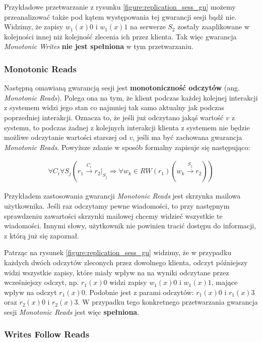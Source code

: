 Przykładowe przetwarzanie z rysunku \ref{figure:replication_sess_gu} możemy przeanalizować także pod kątem występowania tej gwarancji sesji bądź nie. Widzimy, że zapisy $ w_1(x)0 $ i $ w_1(x)1 $ na serwerze $ S_2 $ zostały zaaplikowane w kolejności innej niż kolejność zlecenia ich przez klienta. Tak więc gwarancja \textit{Monotonic Writes} \textbf{nie jest spełniona} w tym przetwarzaniu.

\subsubsection{Monotonic Reads}

Następną omawianą gwarancją sesji jest \textbf{monotoniczność odczytów} (ang. \textit{Monotonic Reads}). Polega ona na tym, że klient podczas każdej kolejnej interakcji z systemem widzi jego stan co najmniej tak samo aktualny jak podczas poprzedniej interakcji. Oznacza to, że jeśli już odczytano jakąś wartość $ v $ z systemu, to podczas żadnej z kolejnych interakcji klienta z systemem nie będzie możliwe odczytanie wartości starszej od $ v $, jeśli ma być zachowana gwarancja \textit{Monotonic Reads}. Powyższe zdanie w sposób formalny zapisuje się następująco:

\begin{align*}
    \forall{C_i} \forall{S_j} (r_1 \xrightarrow{C_i} r_2|_{S_j} \Rightarrow \forall{w_k} \in RW(r_1) (w_k \xrightarrow{S_j} r_2))
\end{align*}

Przykładem zastosowania gwarancji \textit{Monotonic Reads} jest skrzynka mailowa użytkownika. Jeśli raz odczytamy pewne wiadomości, to przy następnym sprawdzeniu zawartości skrzynki mailowej chcemy widzieć wszystkie te wiadomości. Innymi słowy, użytkownik nie powinien tracić dostępu do informacji, z którą już się zapoznał.

Patrząc na rysunek \ref{figure:replication_sess_gu} widzimy, że w przypadku każdych dwóch odczytów zleconych przez dowolnego klienta, odczyt późniejszy widzi wszystkie zapisy, które miały wpływ na na wyniki odczytane przez wcześniejszy odczyt, np. $ r_1(x)0 $ widzi zapisy $ w_1(x)0 $ i $ w_1(x)1 $, mające wpływ na odczyt $ r_1(x)0 $. Podobnie jest z parami odczytów: $ r_1(x)0 $ i $ r_1(x)3 $ oraz $ r_2(x)0 $ i $ r_2(x)3 $. W przypadku tego konkretnego przetwarzania gwarancja sesji \textit{Monotonic Reads} jest więc \textbf{spełniona}.

\subsubsection{Writes Follow Reads}

